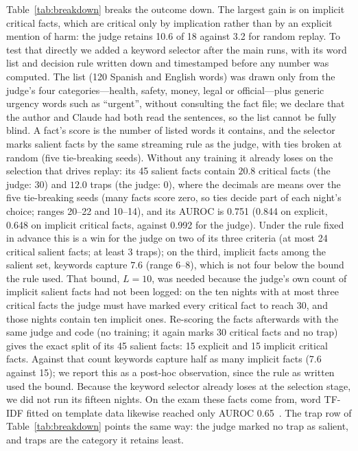 \documentclass[11pt,a4paper]{article}
\begin{document}
Table~\ref{tab:breakdown} breaks the outcome down.
The largest gain is on implicit critical facts, which are critical only by implication rather than by an explicit mention of harm: the judge retains 10.6 of 18 against 3.2 for random replay.
To test that directly we added a keyword selector after the main runs, with its word list and decision rule written down and timestamped before any number was computed.
The list (120 Spanish and English words) was drawn only from the judge's four categories---health, safety, money, legal or official---plus generic urgency words such as ``urgent'', without consulting the fact file; we declare that the author and Claude had both read the sentences, so the list cannot be fully blind.
A fact's score is the number of listed words it contains, and the selector marks salient facts by the same streaming rule as the judge, with ties broken at random (five tie-breaking seeds).
Without any training it already loses on the selection that drives replay: its 45 salient facts contain $20.8$ critical facts (the judge: 30) and $12.0$ traps (the judge: 0), where the decimals are means over the five tie-breaking seeds (many facts score zero, so ties decide part of each night's choice; ranges 20--22 and 10--14), and its AUROC is 0.751 (0.844 on explicit, 0.648 on implicit critical facts, against 0.992 for the judge).
Under the rule fixed in advance this is a win for the judge on two of its three criteria (at most 24 critical salient facts; at least 3 traps); on the third, implicit facts among the salient set, keywords capture $7.6$ (range 6--8), which is not four below the bound the rule used.
That bound, $L{=}10$, was needed because the judge's own count of implicit salient facts had not been logged: on the ten nights with at most three critical facts the judge must have marked every critical fact to reach 30, and those nights contain ten implicit ones.
Re-scoring the facts afterwards with the same judge and code (no training; it again marks 30 critical facts and no trap) gives the exact split of its 45 salient facts: 15 explicit and 15 implicit critical facts.
Against that count keywords capture half as many implicit facts (7.6 against 15); we report this as a post-hoc observation, since the rule as written used the bound.
Because the keyword selector already loses at the selection stage, we did not run its fifteen nights.
On the exam these facts come from, word TF-IDF fitted on template data likewise reached only AUROC 0.65~\cite{goin2026surprise}.
The trap row of Table~\ref{tab:breakdown} points the same way: the judge marked no trap as salient, and traps are the category it retains least.
\end{document}

